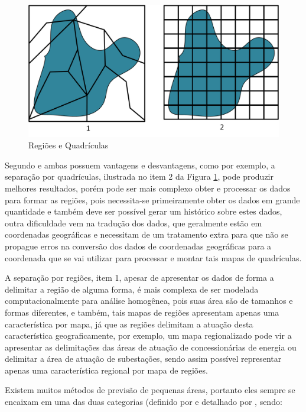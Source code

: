 \begin{figure}[h]
	\centering	
	\includegraphics[scale=0.55]{Figuras/RegionsAndQuadrics.png}
	\caption{Regiões e Quadrículas}
	\label{fig:RegionsAndQuadrics}
\end{figure}

Segundo \citeauthor{arango2000thesis} \cite{arango2000thesis}  e \citeauthor{willis2002spatial} \cite{willis2002spatial}  ambas possuem vantagens e desvantagens, como por exemplo, a separação por quadrículas, ilustrada no item 2 da Figura \ref{fig:RegionsAndQuadrics}, pode produzir melhores resultados, porém pode ser mais complexo obter e processar os dados para formar as regiões, pois necessita-se primeiramente obter os dados em grande quantidade e também deve ser possível gerar um histórico sobre estes dados, outra dificuldade vem na tradução dos dados, que geralmente estão em coordenadas geográficas e necessitam de um tratamento extra para que não se propague erros na conversão dos dados de coordenadas geográficas para a coordenada que se vai utilizar para processar e montar tais mapas de quadrículas. 

A separação por regiões, item 1, apesar de apresentar os dados de forma a delimitar a região de alguma forma, é mais complexa de ser modelada computacionalmente para análise homogênea, pois suas área são de tamanhos e formas diferentes, e também, tais mapas de regiões apresentam apenas uma característica por mapa, já que as regiões delimitam a atuação desta característica geograficamente, por exemplo, um mapa regionalizado pode vir a apresentar as delimitações das áreas de atuação de concessionárias de energia ou  delimitar a área de atuação de subestações, sendo assim possível representar apenas uma característica regional por mapa de regiões. 

Existem muitos métodos de previsão de pequenas áreas, portanto eles sempre se encaixam em uma das duas categorias (definido por \citeauthor{willis2002spatial} \cite{willis2002spatial} e detalhado por \citeauthor{arango2000thesis} \cite{arango2000thesis}, sendo:

